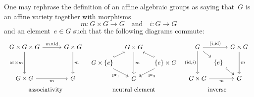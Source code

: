 

\begin{remark}
  One may rephrase the definition of an affine algebraic groups as saying that~$G$ is an affine variety together with morphisms
  \[
            m
    \colon  G \times G
    \to     G
    \quad\text{and}\quad
            i
    \colon  G
    \to     G
  \]
  and an element~$e \in G$ such that the following diagrams commute:
  \[
    \renewcommand{\arraystretch}{1.5}
    \renewcommand{\arraycolsep}{3.3pt}
    \begin{array}{ccc}
        \begin{tikzcd}[column sep = 30pt, row sep = 35pt]
            G \times G \times G
            \arrow{r}[above]{m \times \id}
            \arrow{d}[left]{\id \times m}
          & G \times G
            \arrow{d}[right]{m}
          \\
            G \times G
            \arrow{r}[below]{m}
          & G
        \end{tikzcd}
      &
        \begin{tikzcd}[column sep = 10pt, row sep = 9pt]
            {}
          & G \times G
            \arrow{dd}[right]{m}
          & {}
          \\
            G \times \{e\}
            \arrow[hook]{ur}
            \arrow[two heads]{dr}[below left]{\pr_1}
          & {}
          & \{e\} \times G
            \arrow[hook']{ul}
            \arrow[two heads]{dl}[below right]{\pr_2}
          \\
            {}
          & G
          & {}
        \end{tikzcd}
      &
        \begin{tikzcd}[column sep = 3pt, row sep = 9pt]
            G
            \arrow{rr}[above]{(i,\id)}
            \arrow{dd}[left]{(\id,i)}
            \arrow{dr}
          & {}
          & G \times G
            \arrow{dd}[right]{m}
          \\
            {}
          & \{e\}
            \arrow[hook]{dr}
          & {}
          \\
            G \times G
            \arrow{rr}[below]{m}
          & {}
          & G
        \end{tikzcd}
    \\
        \text{associativity}
      & \text{neutral element}
      & \text{inverse}
    \end{array}
  \]


\end{remark}
